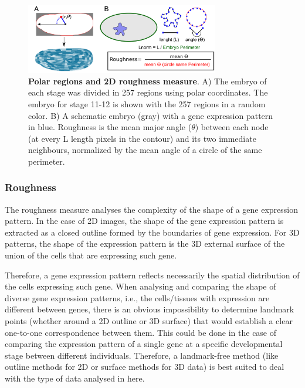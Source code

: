 
\begin{figure}[h]
  \includegraphics[width=0.75\textwidth]{./Images/roughness_regions.png}
  \centering
  \caption{\textbf{Polar regions and 2D roughness measure}. A) The embryo of each stage was divided in 257 regions using polar coordinates. The embryo for stage 11-12 is shown with the 257 regions in a random color. B) A schematic embryo (gray) with a gene expression pattern in blue. Roughness is the mean major angle ($\theta$) between each node (at every L length pixels in the contour) and its two immediate neighbours, normalized by the mean angle of a circle of the same perimeter.
   }
  \label{fig:roughness_regions}
\end{figure}

\subsubsection{Roughness}
\label{Methods_roughness}
The roughness measure analyses the complexity of the shape of a gene expression pattern. In the case of 2D images, the shape of the gene expression pattern is extracted as a closed outline formed by the boundaries of gene expression. For 3D patterns, the shape of the expression pattern is the 3D external surface of the union of the cells that are expressing such gene.

Therefore, a gene expression pattern reflects necessarily the spatial distribution of the cells expressing such gene. When analysing and comparing the shape of diverse gene expression patterns, i.e., the cells/tissues with expression are different between genes, there is an obvious impossibility to determine landmark points (whether around a 2D outline or 3D surface) that would establish a clear one-to-one correspondence between them. This could be done in the case of comparing the expression pattern of a single gene at a specific developmental stage between different individuals.
Therefore, a landmark-free method (like outline methods for 2D or surface methods for 3D data) is best suited to deal with the type of data analysed in here.

